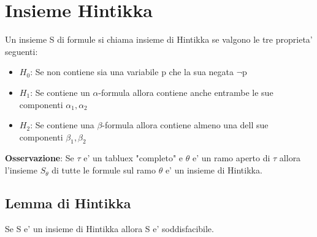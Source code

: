 \documentclass{article}
\begin{document}
        \section{Insieme Hintikka}
        \begin{flushleft}
            Un insieme S di formule si chiama insieme di Hintikka se valgono le tre proprieta' seguenti:
            \begin{itemize}
                \item $H_0$: Se non contiene sia una variabile p che la sua negata $\neg$p
                \item $H_1$: Se contiene un $\alpha$-formula allora contiene anche entrambe le sue componenti $\alpha_1,\alpha_2$
                \item $H_2$: Se contiene una $\beta$-formula allora contiene almeno una dell sue componenti $\beta_1,\beta_2$
            \end{itemize}
            \textbf{Osservazione}: Se $\tau$ e' un tabluex "completo" e $\theta$ e' un ramo aperto di $\tau$ allora
            l'insieme $S_\theta$ di tutte le formule sul ramo $\theta$ e' un insieme di Hintikka.
        \end{flushleft}
        \subsection{Lemma di Hintikka}
        \begin{flushleft}
            Se S e' un insieme di Hintikka allora S e' soddisfacibile.
        \end{flushleft}
\end{document}
